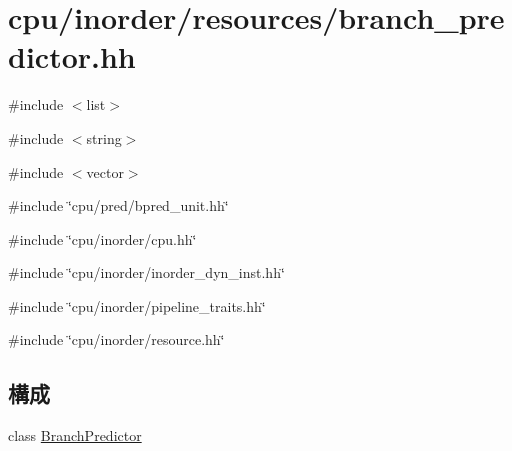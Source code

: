 \hypertarget{branch__predictor_8hh}{
\section{cpu/inorder/resources/branch\_\-predictor.hh}
\label{branch__predictor_8hh}
}
{\ttfamily \#include $<$list$>$}\par
{\ttfamily \#include $<$string$>$}\par
{\ttfamily \#include $<$vector$>$}\par
{\ttfamily \#include \char`\"{}cpu/pred/bpred\_\-unit.hh\char`\"{}}\par
{\ttfamily \#include \char`\"{}cpu/inorder/cpu.hh\char`\"{}}\par
{\ttfamily \#include \char`\"{}cpu/inorder/inorder\_\-dyn\_\-inst.hh\char`\"{}}\par
{\ttfamily \#include \char`\"{}cpu/inorder/pipeline\_\-traits.hh\char`\"{}}\par
{\ttfamily \#include \char`\"{}cpu/inorder/resource.hh\char`\"{}}\par
\subsection*{構成}
\begin{DoxyCompactItemize}
\item 
class \hyperlink{classBranchPredictor}{BranchPredictor}
\end{DoxyCompactItemize}
